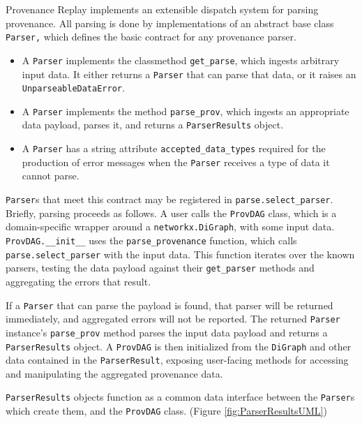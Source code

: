 Provenance Replay implements an extensible dispatch system for parsing
provenance. All parsing is done by implementations of an abstract base class
\texttt{Parser,} which defines the basic contract for any provenance parser. 
\begin{itemize}
    \item A \texttt{Parser} implements the classmethod \texttt{get\_parse},
        which ingests arbitrary input data. It either returns a \texttt{Parser} that
        can parse that data, or it raises an \texttt{UnparseableDataError}.
    \item A \texttt{Parser} implements the method \texttt{parse\_prov}, which
        ingests an appropriate data payload, parses it, and returns a
        \texttt{ParserResults} object.
    \item A \texttt{Parser} has a string attribute \texttt{accepted\_data\_types}
        required for the production of error messages when the \texttt{Parser}
        receives a type of data it cannot parse.
\end{itemize}

\texttt{Parser}s that meet this contract may be registered in \texttt{parse.select\_parser}.
Briefly, parsing proceeds as follows. A user calls the \texttt{ProvDAG} class, which is a
domain-specific wrapper around a \texttt{networkx.DiGraph}, with some input data.
\texttt{ProvDAG.\_\_init\_\_} uses the \texttt{parse\_provenance} function, which calls
\texttt{parse.select\_parser} with the input data. This function iterates over the known
parsers, testing the data payload against their \texttt{get\_parser} methods and
aggregating the errors that result. 

If a \texttt{Parser} that can parse the payload is found, that parser will be returned
immediately, and aggregated errors will not be reported. The returned \texttt{Parser}
instance’s \texttt{parse\_prov} method parses the input data payload and returns a
\texttt{ParserResults} object. A \texttt{ProvDAG} is then initialized from the \texttt{DiGraph} and other
data contained in the \texttt{ParserResult}, exposing user-facing methods for accessing
and manipulating the aggregated provenance data.

\texttt{ParserResults} objects function as a common data interface between the \texttt{Parser}s
which create them, and the \texttt{ProvDAG} class. (Figure \ref{fig:ParserResultsUML})

